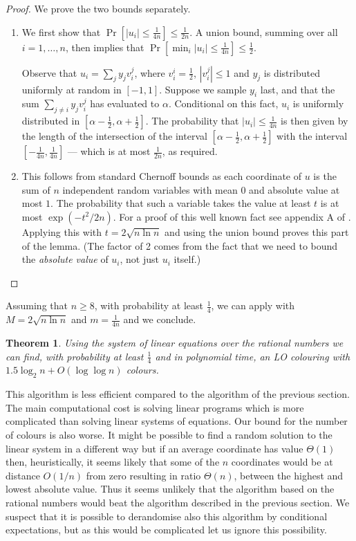 \documentclass[a4paper,11pt]{article}
\theoremstyle{plain}
\newtheorem{theorem}{Theorem}
\theoremstyle{definition}
\begin{document}
\begin{proof}
We prove the two bounds separately. 
\begin{enumerate}
\item We first show that $\Pr[|u_i| \leq \frac{1}{4n}] \leq \frac{1}{2n}$. A union bound, summing over all $i = 1, \ldots, n$, then implies that $\Pr[\min_i |u_i| \leq \frac{1}{4n}] \leq \frac{1}{2}$.

Observe that $u_i = \sum_j y_j v_i^j$, where $v^i_i = \frac{1}{2}$, $|v_i^j| \leq 1$ and $y_j$ is distributed uniformly at random in $[-1, 1]$. Suppose we sample $y_i$ last, and that the sum $\sum_{j \neq i} y_j v_i^j$ has evaluated to $\alpha$. Conditional on this fact, $u_i$ is uniformly distributed in $[\alpha - \frac{1}{2}, \alpha + \frac{1}{2}]$. The probability that $|u_i| \leq \frac{1}{4n}$ is then given by the length of the intersection of the interval $[\alpha - \frac{1}{2}, \alpha + \frac{1}{2}]$ with the interval $[- \frac{1}{4n}, \frac{1}{4n}]$ --- which is at most $\frac{1}{2n}$, as required.

\item This follows from standard Chernoff bounds as each coordinate of $u$ is the sum of $n$ independent random variables with mean $0$ and absolute value at most $1$.  The probability that such a variable takes the value at least $t$ is at most $\exp (-t^2/2n)$.  For a proof of this well known fact see appendix A of \cite{alonspencer}.  Applying this with $t=2 \sqrt{n \ln{n}}$ and using the union bound proves this part of the lemma. (The factor of 2 comes from the fact that we need to bound the \emph{absolute value} of $u_i$, not just $u_i$ itself.)\qedhere
\end{enumerate}
\end{proof}

Assuming that $n \geq 8$, with probability at least $\frac 14$, we can apply  with $M=2 \sqrt{n \ln{n}}$ and
$m= \frac{1}{4 n}$ and we conclude.

\begin{theorem}
Using the system of linear equations over the
rational numbers we can find, with probability at least $\frac{1}{4}$ and in polynomial time, an LO colouring with  $1.5 \log_2 n + O(\log \log n)$ colours.
\end{theorem}

This algorithm is less efficient compared to the algorithm of the previous section.  The main
computational cost is solving linear programs which is more complicated than solving linear systems of equations.  Our bound for the number of colours is
also worse.  It might be possible to find a random solution to the linear system in a different way but if an average coordinate has value $\Theta (1)$ then, heuristically, it seems likely that some of the $n$ coordinates would be at distance $O(1/n)$ from zero resulting in ratio $\Theta (n)$, between the highest and lowest absolute value.  Thus it seems unlikely that the algorithm based on the rational numbers would beat the algorithm described in the previous section. We suspect that it is possible to derandomise  also this algorithm by conditional expectations, but as this would be complicated let us ignore this possibility.
\end{document}
